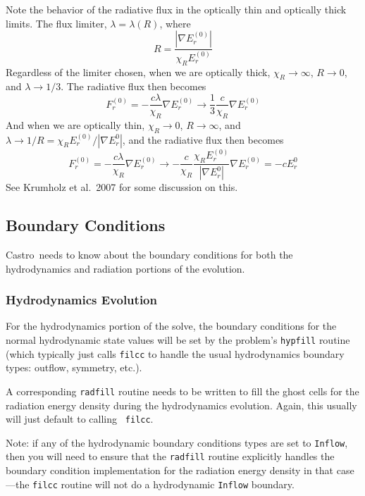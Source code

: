 \documentclass[11pt,letterpaper]{article}
\newcommand{\castro}{{\sf Castro}}
\begin{document}
Note the behavior of the radiative flux in the optically thin and
optically thick limits.  The flux limiter, $\lambda = \lambda(R)$,
where
\begin{equation}
  R = \frac{|\nabla E_r^{(0)}|}{\chi_R E_r^{(0)}}
\end{equation}
Regardless of the limiter chosen, when we are optically thick,
$\chi_R \rightarrow \infty$, $R \rightarrow 0$, and $\lambda \rightarrow 1/3$.
The radiative flux then becomes
\begin{equation}
  F_r^{(0)} = -\frac{c\lambda}{\chi_R} \nabla E_r^{(0)} \rightarrow
  \frac{1}{3} \frac{c}{\chi_R} \nabla E_r^{(0)}
\end{equation}
And when we are optically thin, $\chi_R \rightarrow 0$, $R \rightarrow \infty$,
and $\lambda \rightarrow 1/R = \chi_R E_r^{(0)}/{|\nabla E_r^{0}|}$, and
the radiative flux then becomes
\begin{equation}
  F_r^{(0)} = -\frac{c\lambda}{\chi_R} \nabla E_r^{(0)} \rightarrow
  -\frac{c}{\chi_R}\frac{\chi_R E_r^{(0)}}{|\nabla E_r^{0}|}
    \nabla E_r^{(0)} = -c E_r^{0}
\end{equation}
See Krumholz et al.\ 2007 for some discussion on this.
\subsection{Boundary Conditions}

\castro\ needs to know about the boundary conditions for both
the hydrodynamics and radiation portions of the evolution.

\subsubsection{Hydrodynamics Evolution}

For the hydrodynamics portion of the solve, the boundary conditions
for the normal hydrodynamic state values will be set by the problem's
{\tt hypfill} routine (which typically just calls {\tt filcc} to handle
the usual hydrodynamics boundary types: outflow, symmetry, etc.).

A corresponding {\tt radfill} routine needs to be written to fill the
ghost cells for the radiation energy density during the hydrodynamics
evolution.  Again, this usually will just default to calling {\tt
  filcc}.

Note: if any of the hydrodynamic boundary conditions types are set
to {\tt Inflow}, then you will need to ensure that the {\tt radfill}
routine explicitly handles the boundary condition implementation
for the radiation energy density in that case---the {\tt filcc}
routine will not do a hydrodynamic {\tt Inflow} boundary.
\end{document}
